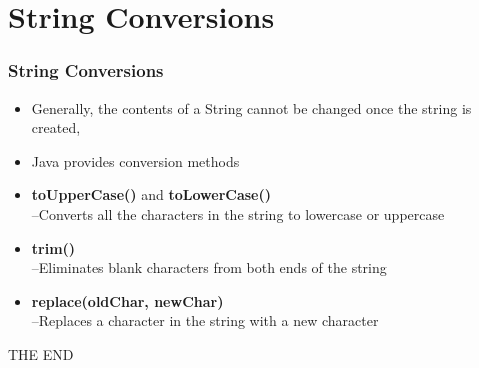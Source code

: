 \documentclass{beamer}
\begin{document}

\section{String Conversions}

\begin{frame}
\frametitle{String Conversions}
\begin{itemize}
\item Generally, the contents of a String cannot be
changed once the string is created,
\item Java provides conversion methods
\item \textbf{toUpperCase()} and \textbf{toLowerCase()}\\
–Converts all the characters in the string to lowercase or
uppercase\\
\item \textbf{trim()}\\
–Eliminates blank characters from both ends of the string\\
\item \textbf{replace(oldChar, newChar)}\\
–Replaces a character in the string with a new character
\end{itemize}
\end{frame}


\begin{frame}
\Huge{\centerline{THE END }}
\end{frame}

\end{document}
